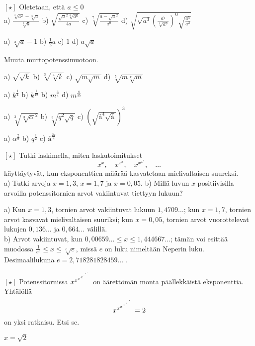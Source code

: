\begin{tehtavasivu}
\begin{tehtava} 
$\boldsymbol{[\star]}$ Oletetaan, että $a\leq0$ \\
a) $\frac{\sqrt[3]{a^2}-\sqrt[3]{a}}{\sqrt[3]{a}}$ \qquad
b) $\sqrt{\frac{\sqrt{a}^2\sqrt[3]{a^6}}{4a}}$ \qquad
c) $\sqrt[7]{\frac{a-\sqrt{a}^2}{a^0}}$ \qquad
d) $\sqrt{\sqrt{a^3}\left(\frac{a^7}{\sqrt[5]{a^3}}\right)^0\sqrt{\frac{a^5}{a^2}}}$
\begin{vastaus}
a) $\sqrt[3]{a}-1$ \qquad
b) $\frac{1}{2}a$ \qquad
c) $1$ \qquad
d) $a\sqrt{a}$
\end{vastaus}
\end{tehtava}

Muuta murtopotenssimuotoon.

\begin{tehtava}
a) $\sqrt{\sqrt{k}}$ \qquad
b) $\sqrt[3]{\sqrt[4]{k}}$ \qquad
c) $\sqrt{m\sqrt{m}}$ \qquad
d) $\sqrt[5]{m\sqrt[7]{m}}$ \qquad
\begin{vastaus}	
a) $k^\frac{1}{4}$ \qquad
b) $k^\frac{1}{12}$ \qquad
b) $m^\frac{3}{4}$ \qquad
d) $m^\frac{8}{35}$ 
\end{vastaus}
\end{tehtava}

\begin{tehtava}
a) $\sqrt[3]{\sqrt[3]{\alpha}^2}$ \qquad
b) $\sqrt[5]{q^2\sqrt{q}}$ \qquad
c) $\left(\sqrt{å^4\sqrt{å}}\right)^3$ \qquad
\begin{vastaus}	
a) $\alpha^\frac{2}{9}$ \qquad
b) $q^\frac{1}{2}$ \qquad
c) $å^\frac{27}{4}$
\end{vastaus}
\end{tehtava}

\begin{tehtava}
$\boldsymbol{[\star]}$ Tutki laskimella, miten laskutoimitukset
\[ x^x, \quad x^{x^x}, \quad x^{x^{x^x}}, \quad \ldots \] 
käyttäytyvät, kun eksponenttien määrää kasvatetaan mielivaltaisen
suureksi.\\
a) Tutki arvoja $x=1,3$, $x=1,7$ ja $x=0,05$.
b) Millä luvun $x$ positiivisilla arvoilla potenssitornien arvot
vakiintuvat tiettyyn lukuun?
\begin{vastaus}
a) Kun $x = 1,3$, tornien arvot vakiintuvat lukuun $1,4709\ldots$;
kun $x = 1,7$, tornien arvot kasvavat mielivaltaisen suuriksi;
kun $x=0,05$, tornien arvot vuorottelevat lukujen $0,136\ldots$
ja $0,664\ldots$ välillä. \\
b) Arvot vakiintuvat, kun $0,00659 \ldots \leq x \leq 1,444667\ldots$;
tämän voi esittää muodossa $\frac{1}{e^e} \leq x \leq \sqrt[e]{e}$, missä
$e$ on luku nimeltään Neperin luku. Desimaalilukuna $e = 2,718281828459 \ldots$ .
\end{vastaus}
\end{tehtava}
\begin{tehtava}
$\boldsymbol{[\star]}$ Potenssitornissa $x^{x^{x^{x^{\mathstrut^{.^{.^{.}}}}}}} $
on äärettömän monta päällekkäistä eksponenttia. Yhtälöllä
\[ x^{x^{x^{x^{\mathstrut^{.^{.^{.}}}}}}} =2\]
on yksi ratkaisu. Etsi se.
\begin{vastaus}
$x = \sqrt{2}$
\end{vastaus}
\end{tehtava}

\end{tehtavasivu}

